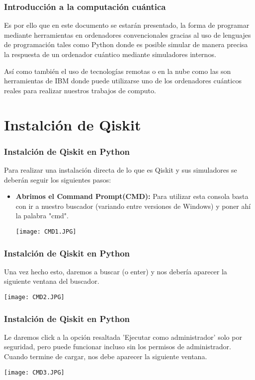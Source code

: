\documentclass[spanish]{beamer}
\begin{document}
\newpage
\setlength{\parskip}{5mm}
\begin{frame}
\frametitle{Introducción a la computación cuántica}
Es por ello que en este documento se estarán presentado, la forma de programar mediante herramientas en ordenadores convencionales gracias al uso de lenguajes de programación tales como Python donde es posible simular de manera precisa la respuesta de un ordenador cuántico mediante simuladores internos. 

Así como también el uso de tecnologías remotas o en la nube como las son herramientas de IBM donde puede utilizarse uno de los ordenadores cuánticos reales para realizar nuestros trabajos de computo.
\end{frame}

\newpage
\section{Instalción de Qiskit}
\begin{frame}
\frametitle{Instalción de Qiskit en Python}
\setlength{\parskip}{5mm}
\justify
Para realizar una instalación directa de lo que es Qiskit y sus simuladores se deberán seguir los siguientes pasos:

\begin{itemize}
        \item\textbf{ Abrimos el Command Prompt(CMD):}
         Para utilizar esta consola basta con ir a nuestro buscador (variando entre versiones de Windows) y poner ahí la palabra "cmd".
        
    \centering\texttt{[image: CMD1.JPG]}
    \end{itemize}
    \end{frame} 
    

    \begin{frame}
    \frametitle{Instalción de Qiskit en Python}
        Una vez hecho esto, daremos a buscar (o enter) y nos debería aparecer la siguiente ventana del buscador.
        
    \centering\texttt{[image: CMD2.JPG]}
    \end{frame} 

    \begin{frame}
    \frametitle{Instalción de Qiskit en Python}
        Le daremos click a la opción resaltada 'Ejecutar como administrador' solo por seguridad, pero puede funcionar incluso sin los permisos de administrador. Cuando termine de cargar, nos debe aparecer la siguiente ventana.
        
    \centering\texttt{[image: CMD3.JPG]}
    \end{frame} 
\end{document}
